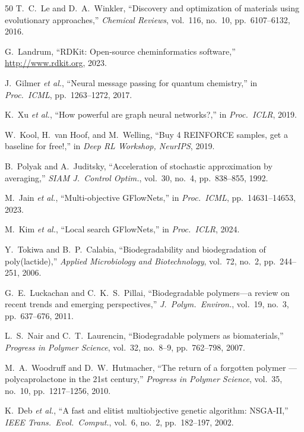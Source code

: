 \documentclass[twocolumn,10pt]{article}
\begin{document}
\begin{thebibliography}{50}
T.~C.~Le and D.~A.~Winkler, ``Discovery and optimization of materials using evolutionary approaches,'' \textit{Chemical Reviews}, vol.~116, no.~10, pp.~6107--6132, 2016.

G.~Landrum, ``RDKit: Open-source cheminformatics software,'' \url{http://www.rdkit.org}, 2023.

J.~Gilmer \textit{et al.}, ``Neural message passing for quantum chemistry,'' in \textit{Proc.\ ICML}, pp.~1263--1272, 2017.

K.~Xu \textit{et al.}, ``How powerful are graph neural networks?,'' in \textit{Proc.\ ICLR}, 2019.

W.~Kool, H.~van Hoof, and M.~Welling, ``Buy 4 REINFORCE samples, get a baseline for free!,'' in \textit{Deep RL Workshop, NeurIPS}, 2019.

B.~Polyak and A.~Juditsky, ``Acceleration of stochastic approximation by averaging,'' \textit{SIAM J.\ Control Optim.}, vol.~30, no.~4, pp.~838--855, 1992.

M.~Jain \textit{et al.}, ``Multi-objective GFlowNets,'' in \textit{Proc.\ ICML}, pp.~14631--14653, 2023.

M.~Kim \textit{et al.}, ``Local search GFlowNets,'' in \textit{Proc.\ ICLR}, 2024.

Y.~Tokiwa and B.~P.~Calabia, ``Biodegradability and biodegradation of poly(lactide),'' \textit{Applied Microbiology and Biotechnology}, vol.~72, no.~2, pp.~244--251, 2006.

G.~E.~Luckachan and C.~K.~S.~Pillai, ``Biodegradable polymers---a review on recent trends and emerging perspectives,'' \textit{J.\ Polym.\ Environ.}, vol.~19, no.~3, pp.~637--676, 2011.

L.~S.~Nair and C.~T.~Laurencin, ``Biodegradable polymers as biomaterials,'' \textit{Progress in Polymer Science}, vol.~32, no.~8--9, pp.~762--798, 2007.

M.~A.~Woodruff and D.~W.~Hutmacher, ``The return of a forgotten polymer --- polycaprolactone in the 21st century,'' \textit{Progress in Polymer Science}, vol.~35, no.~10, pp.~1217--1256, 2010.

K.~Deb \textit{et al.}, ``A fast and elitist multiobjective genetic algorithm: NSGA-II,'' \textit{IEEE Trans.\ Evol.\ Comput.}, vol.~6, no.~2, pp.~182--197, 2002.


\end{thebibliography}
\end{document}
